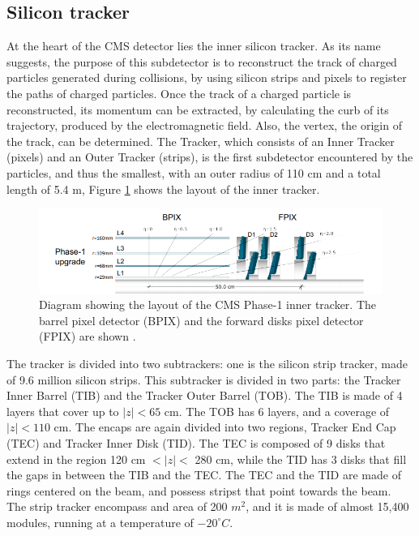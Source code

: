 \subsection{ Silicon tracker}
At the heart of the CMS detector lies the inner silicon tracker. As its name suggests, the purpose of this subdetector is to reconstruct the track of charged particles generated during collisions, by using silicon strips and pixels to register the paths of charged particles. Once the track of a charged particle is reconstructed, its momentum can be extracted, by calculating the curb of its trajectory, produced by the electromagnetic field. Also, the vertex, the origin of the track, can be determined. The Tracker, which consists of an Inner Tracker (pixels) and an Outer Tracker (strips), is the first subdetector encountered by the particles, and thus the smallest, with an outer radius of 110 cm and a total length of 5.4 m, Figure \ref{tracker} shows the layout of the inner tracker.
\begin{center}
\begin{figure}[ht]
    \centering
    \includegraphics[width=1\textwidth]{Chapter2/pixel-detector.png}
    \caption[CMS tracker.]{Diagram showing the layout of the CMS Phase-1 inner tracker. The barrel pixel detector (BPIX) and the forward disks pixel detector (FPIX) are shown \cite{CMSTrackerGroup:2020edz}.}
    \label{tracker}
\end{figure}
\end{center}
The tracker is divided into two subtrackers: one is the silicon strip tracker, made of 9.6 million silicon strips. This subtracker is divided in two parts: the Tracker Inner Barrel (TIB) and the Tracker Outer Barrel (TOB). The TIB is made of 4 layers that cover up to $|z|<65$ cm. The TOB has 6 layers, and a coverage of $|z|<110$ cm. The encaps are again divided into two regions,  Tracker End Cap (TEC) and Tracker Inner Disk (TID). The TEC is composed of 9 disks that extend in the region 120 cm $<|z|<$ 280 cm, while the TID has 3 disks that fill the gaps in between the TIB and the TEC. The TEC and the TID are made of rings centered on the beam, and possess stripst that point towards the beam.\\
The strip tracker encompass and area of 200 $m^2$, and it is made of almost 15,400 modules, running at a  temperature of $-20^{\circ} C$.

